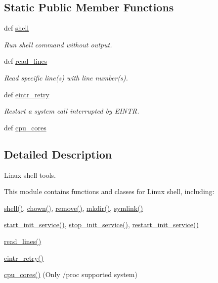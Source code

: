 \subsection*{Static Public Member Functions}
\begin{DoxyCompactItemize}
\item 
def \hyperlink{classadmin_1_1shell_a2ffff5c7d8eb2d2cc174df10ac1523b2}{shell}
\begin{DoxyCompactList}\small\item\em Run shell command without output. \end{DoxyCompactList}\item 
def \hyperlink{classadmin_1_1shell_a088a4609cf54f76ee4c838eea157fbc9}{read\-\_\-lines}
\begin{DoxyCompactList}\small\item\em Read specific line(s) with line number(s). \end{DoxyCompactList}\item 
def \hyperlink{classadmin_1_1shell_a5200a0188543eaaa2eb33fc295da0733}{eintr\-\_\-retry}
\begin{DoxyCompactList}\small\item\em Restart a system call interrupted by {\ttfamily E\-I\-N\-T\-R}. \end{DoxyCompactList}\item 
def \hyperlink{classadmin_1_1shell_a79f2a3efc85b54c29621697087299778}{cpu\-\_\-cores}
\end{DoxyCompactItemize}


\subsection{Detailed Description}
Linux shell tools. 

This module contains functions and classes for Linux shell, including\-:


\begin{DoxyItemize}
\item \hyperlink{classadmin_1_1shell_a2ffff5c7d8eb2d2cc174df10ac1523b2}{shell()}, \hyperlink{classadmin_1_1shell_a539012368a068a40cd347acbe49989d5}{chown()}, \hyperlink{classadmin_1_1shell_ad4f8d9280283a993eec0bc5dcade6d99}{remove()}, \hyperlink{classadmin_1_1shell_adcdf00aa6acc1cf519ece418ce14a7f1}{mkdir()}, \hyperlink{classadmin_1_1shell_a9cc97c2976b95fbcfa88b314803aa2bf}{symlink()}
\item \hyperlink{classadmin_1_1shell_a432e79bf26b0adb3e7fcf2f13f96229e}{start\-\_\-init\-\_\-service()}, \hyperlink{classadmin_1_1shell_a20ba085e92f2f4a9332d8d9c95ce7aa1}{stop\-\_\-init\-\_\-service()}, \hyperlink{classadmin_1_1shell_ab6f38a2fae6ea2cc870c1de2d6cb6017}{restart\-\_\-init\-\_\-service()}
\item \hyperlink{classadmin_1_1shell_a088a4609cf54f76ee4c838eea157fbc9}{read\-\_\-lines()}
\item \hyperlink{classadmin_1_1shell_a5200a0188543eaaa2eb33fc295da0733}{eintr\-\_\-retry()}
\item \hyperlink{classadmin_1_1shell_a79f2a3efc85b54c29621697087299778}{cpu\-\_\-cores()} (Only /proc supported system) 
\end{DoxyItemize}

